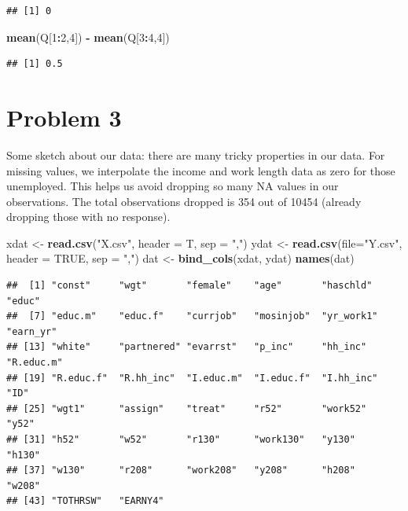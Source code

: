 \documentclass[]{article}
\newenvironment{Shaded}{\begin{snugshade}}{\end{snugshade}}
\newcommand{\KeywordTok}[1]{\textcolor[rgb]{0.13,0.29,0.53}{\textbf{#1}}}
\newcommand{\DataTypeTok}[1]{\textcolor[rgb]{0.13,0.29,0.53}{#1}}
\newcommand{\DecValTok}[1]{\textcolor[rgb]{0.00,0.00,0.81}{#1}}
\newcommand{\StringTok}[1]{\textcolor[rgb]{0.31,0.60,0.02}{#1}}
\newcommand{\OtherTok}[1]{\textcolor[rgb]{0.56,0.35,0.01}{#1}}
\newcommand{\OperatorTok}[1]{\textcolor[rgb]{0.81,0.36,0.00}{\textbf{#1}}}
\newcommand{\NormalTok}[1]{#1}
\begin{document}
\begin{verbatim}
## [1] 0
\end{verbatim}

\begin{Shaded}
\begin{Highlighting}[]
\KeywordTok{mean}\NormalTok{(Q[}\DecValTok{1}\OperatorTok{:}\DecValTok{2}\NormalTok{,}\DecValTok{4}\NormalTok{]) }\OperatorTok{-}\StringTok{ }\KeywordTok{mean}\NormalTok{(Q[}\DecValTok{3}\OperatorTok{:}\DecValTok{4}\NormalTok{,}\DecValTok{4}\NormalTok{])}
\end{Highlighting}
\end{Shaded}

\begin{verbatim}
## [1] 0.5
\end{verbatim}

\section*{Problem 3}

Some sketch about our data: there are many tricky properties in our
data. For missing values, we interpolate the income and work length data
as zero for those unemployed. This helps us avoid dropping so many NA
values in our observations. The total observations dropped is 354 out of
10454 (already dropping those with no response).

\begin{Shaded}
\begin{Highlighting}[]
\NormalTok{xdat <-}\StringTok{ }\KeywordTok{read.csv}\NormalTok{(}\StringTok{"X.csv"}\NormalTok{, }\DataTypeTok{header =}\NormalTok{ T, }\DataTypeTok{sep =} \StringTok{","}\NormalTok{)}
\NormalTok{ydat <-}\StringTok{ }\KeywordTok{read.csv}\NormalTok{(}\DataTypeTok{file=}\StringTok{"Y.csv"}\NormalTok{, }\DataTypeTok{header =} \OtherTok{TRUE}\NormalTok{, }\DataTypeTok{sep =} \StringTok{","}\NormalTok{)}
\NormalTok{dat <-}\StringTok{ }\KeywordTok{bind_cols}\NormalTok{(xdat, ydat)}
\KeywordTok{names}\NormalTok{(dat)}
\end{Highlighting}
\end{Shaded}

\begin{verbatim}
##  [1] "const"     "wgt"       "female"    "age"       "haschld"   "educ"     
##  [7] "educ.m"    "educ.f"    "currjob"   "mosinjob"  "yr_work1"  "earn_yr"  
## [13] "white"     "partnered" "evarrst"   "p_inc"     "hh_inc"    "R.educ.m" 
## [19] "R.educ.f"  "R.hh_inc"  "I.educ.m"  "I.educ.f"  "I.hh_inc"  "ID"       
## [25] "wgt1"      "assign"    "treat"     "r52"       "work52"    "y52"      
## [31] "h52"       "w52"       "r130"      "work130"   "y130"      "h130"     
## [37] "w130"      "r208"      "work208"   "y208"      "h208"      "w208"     
## [43] "TOTHRSW"   "EARNY4"
\end{verbatim}
\end{document}
